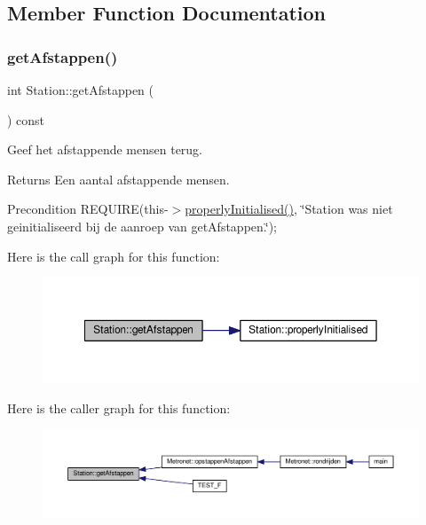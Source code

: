 \subsection{Member Function Documentation}
\mbox{\label{class_station_a36af036851a8e31b7a2be381928dadb5}} 
\subsubsection{\texorpdfstring{get\+Afstappen()}{getAfstappen()}}
{\footnotesize\ttfamily int Station\+::get\+Afstappen (\begin{DoxyParamCaption}{ }\end{DoxyParamCaption}) const}



Geef het afstappende mensen terug. 

\begin{DoxyReturn}{Returns}
Een aantal afstappende mensen. 
\end{DoxyReturn}
\begin{DoxyPrecond}{Precondition}
R\+E\+Q\+U\+I\+RE(this-\/$>$\hyperlink{class_station_a9ce626dd0599e3ea8107404a59c21e16}{properly\+Initialised()}, \char`\"{}\+Station was niet geinitialiseerd bij de aanroep van get\+Afstappen.\char`\"{}); 
\end{DoxyPrecond}
Here is the call graph for this function\+:\nopagebreak
\begin{figure}[H]
\begin{center}
\leavevmode
\includegraphics[width=350pt]{class_station_a36af036851a8e31b7a2be381928dadb5_cgraph}
\end{center}
\end{figure}
Here is the caller graph for this function\+:\nopagebreak
\begin{figure}[H]
\begin{center}
\leavevmode
\includegraphics[width=350pt]{class_station_a36af036851a8e31b7a2be381928dadb5_icgraph}
\end{center}
\end{figure}
\mbox{\label{class_station_aea6c31c39a5e1eb4c30337e7ce489e69}} 
